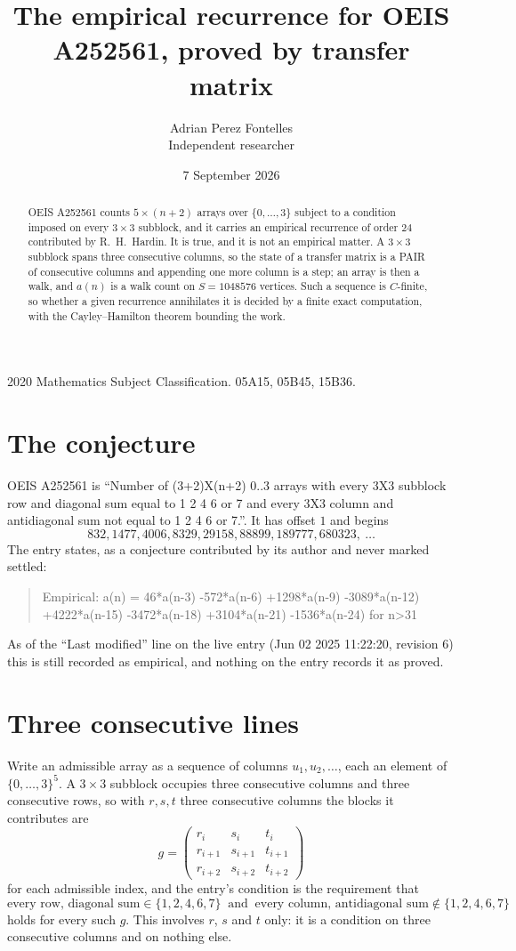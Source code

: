 \documentclass[11pt,a4paper]{article}
\title{The empirical recurrence for OEIS A252561, proved by transfer matrix}
\author{Adrian Perez Fontelles\\ \small Independent researcher}
\date{7 September 2026}
\theoremstyle{plain}
\theoremstyle{definition}
\begin{document}
\maketitle

\begin{abstract}
OEIS A252561 counts $5\times(n+2)$ arrays over $\{0,\dots,3\}$ subject to a condition imposed on
every $3\times3$ subblock, and it carries an empirical recurrence of order $24$
contributed by R.~H.~Hardin. It is true, and it is not an empirical matter. A $3\times3$
subblock spans three consecutive columns, so the state of a transfer matrix is a PAIR of
consecutive columns and appending one more column is a step; an array is then a walk, and
$a(n)$ is a walk count on $S=1048576$ vertices. Such a sequence is $C$-finite, so whether a given
recurrence annihilates it is decided by a finite exact computation, with the Cayley--Hamilton
theorem bounding the work.
\end{abstract}

\noindent\small 2020 Mathematics Subject Classification. 05A15, 05B45, 15B36.\normalsize

\section{The conjecture}

OEIS A252561 is ``Number of (3+2)X(n+2) 0..3 arrays with every 3X3 subblock row and diagonal sum equal to 1 2 4 6 or 7 and every 3X3 column and antidiagonal sum not equal to 1 2 4 6 or 7.''. It has offset $1$ and begins
\[
832, 1477, 4006, 8329, 29158, 88899, 189777, 680323,\ \dots
\]
The entry states, as a conjecture contributed by its author and never marked settled:
\begin{quote}
Empirical: a(n) = 46*a(n-3) -572*a(n-6) +1298*a(n-9) -3089*a(n-12) +4222*a(n-15) -3472*a(n-18) +3104*a(n-21) -1536*a(n-24) for n>31
\end{quote}
As of the ``Last modified'' line on the live entry (Jun 02 2025 11:22:20, revision 6) this is still
recorded as empirical, and nothing on the entry records it as proved.

\section{Three consecutive lines}

Write an admissible array as a sequence of columns $u_1,u_2,\dots$, each an element of
$\{0,\dots,3\}^{5}$. A $3\times3$ subblock occupies three consecutive columns and
three consecutive rows, so with $r,s,t$ three consecutive columns the blocks it
contributes are
\[
g=\begin{pmatrix}r_i&s_i&t_i\\ r_{i+1}&s_{i+1}&t_{i+1}\\ r_{i+2}&s_{i+2}&t_{i+2}\end{pmatrix}
\]
for each admissible index, and the entry's condition is the requirement that
\[
\text{every row, diagonal sum} \in \{1,2,4,6,7\}\ \text{ and }\ \text{every column, antidiagonal sum} \notin \{1,2,4,6,7\}
\]
holds for every such $g$. This involves $r$, $s$ and $t$ only: it is a condition on
three consecutive columns and on nothing else.
\end{document}
